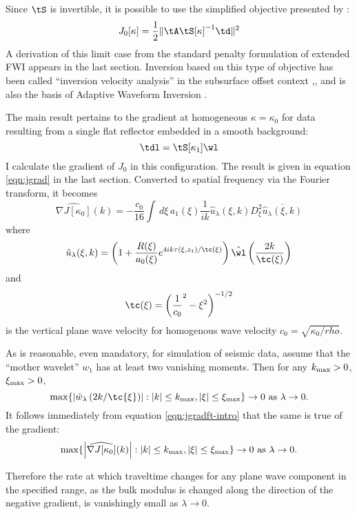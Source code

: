 Since $\tS$ is invertible, it is possible to use the
simplified objective presented by
\cite{Symes:EAGE15}:
\begin{equation}
\label{eqn:dsobj}
J_0[\kappa]=\frac{1}{2}\|\tA \tS[\kappa]^{-1}\td\|^2
\end{equation}
A derivation of this limit case from the standard penalty formulation
of extended FWI 
appears in the last section. Inversion based on this type of objective
has been called ``inversion velocity analysis'' in the subsurface
offset context \cite[]{Herve2017},\cite[]{HouSymes:Geo18}, and is also the
basis of Adaptive Waveform Inversion
\cite{Warner:14,Warner:16}.

The main result pertains to the gradient at homogeneous
$\kappa=\kappa_0$ for data resulting from a single flat reflector
embedded in a smooth background:
\[
\tdl = \tS[\kappa_1]\wl
\]
I calculate the gradient of $J_0$ in this configuration.
The result is given in equation \ref{eqn:jgrad} in the last
section. Converted to spatial frequency via the Fourier transform, it
becomes
\begin{equation}
\label{eqn:jgradft-intro}
\widehat{\nabla J[\kappa_0]}(k) = -\frac{c_0}{16}\int\, d\xi\,a_1(\xi) 
\frac{1}{ik}\hat{u}_{\lambda}(\xi,k)D_{\xi}^2\overline{\hat{u}_{\lambda}(\xi,k)}
\end{equation}
where
\[
\hat{u}_{\lambda}(\xi,k) = \left(1 +
  \frac{R(\xi)}{a_0(\xi)}e^{4ik\tau(\xi,z_1)/\tc(\xi)}\right)\hat{\wl}\left(\frac{2k}{\tc(\xi)}\right) 
\]
and 
\[
\tc(\xi) = \left(\frac{1}{c_0}^2-\xi^2\right)^{-1/2}
\]
is the vertical plane wave velocity for homogenous wave velocity
$c_0 = \sqrt{\kappa_0/rho}$.

As is reasonable, even mandatory, for simulation of seismic data,
assume that the ``mother wavelet'' $w_1$ has at least two vanishing
moments. Then for any $k_{\rm max} >0$, $\xi_{\rm max} > 0$,
\[
\max \{\left|\hat{w}_{\lambda}\left(2k/\tc{\xi}\right)\right|:
|k|\le k_{\rm max}, |\xi|\le \xi_{\rm max} \} \rightarrow 0\mbox{ as }
\lambda \rightarrow 0.
\]
It follows immediately from equation \ref{eqn:jgradft-intro} that the
same is true of the gradient:
\begin{equation}
\label{eqn:bigdeal}
\max \{\left|\widehat{\nabla J[\kappa_0]}(k)\right|:
|k|\le k_{\rm max}, |\xi|\le \xi_{\rm max} \} \rightarrow 0\mbox{ as }
\lambda \rightarrow 0.
\end{equation}

Therefore the rate at which traveltime changes for any plane wave
component in the specified range, as the bulk modulus is changed along
the direction of the negative gradient, is vanishingly small as
$\lambda \rightarrow 0$. 


